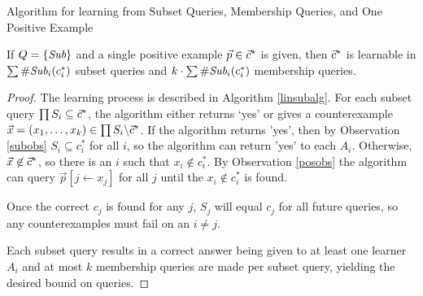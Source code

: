 \documentclass[11pt]{amsart}
\begin{document}
\begin{algorithm}[H]
\label{linsubalg}
\SetAlgoLined
{}
 \;
\caption{Algorithm for learning from Subset Queries, Membership Queries, and One Positive Example}
\end{algorithm}

\begin{proposition}
If $Q = \{\emph{Sub}\}$ and a single positive example $\vec{p} \in \vec{c}^*$ is given, then $\vec{c}^*$ is learnable in $\sum \#\emph{Sub}_{i}(c^*_i)$ subset queries and $k \cdot \sum \#\emph{Sub}_{i}(c^*_i)$ membership queries. 
\end{proposition}
\begin{proof}
The learning process is described in Algorithm \ref{linsubalg}.
For each subset query $\prod S_i \subseteq \vec{c}^*$, the algorithm either returns `yes' or gives a counterexample $\vec{x} = (x_1, \dots, x_k) \in \prod S_i \backslash \vec{c}^*$. 
If the algorithm returns 'yes', then by Observation \ref{subobs} $S_i \subseteq c^*_i$ for all $i$, so the algorithm can return 'yes' to each $A_i$. 
Otherwise, $\vec{x} \not\in \vec{c}^*$, so there is an $i$ such that $x_i \not\in c^*_i$. 
By Observation \ref{posobs} the algorithm can query $\vec{p}[j \leftarrow x_j]$ for all $j$ until the $x_i \not\in c^*_i$ is found. 

Once the correct $c_j$ is found for any $j$, $S_j$ will equal $c_j$ for all future queries, so any counterexamples must fail on an $i \ne j$. 

Each subset query results in a correct answer being given to at least one learner $A_i$ and at most $k$ membership queries are made per subset query, yielding the desired bound on queries. 
\end{proof}
\end{document}
